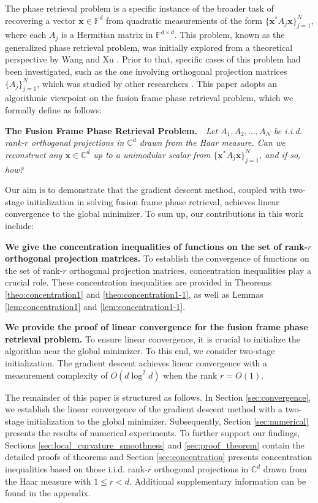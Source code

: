 \documentclass{article}
\newcommand{\C}{{\mathbb C}}
\newcommand{\bbF}{{\mathbb F}}
\newcommand{\vx}{{\mathbf x}}
\newcommand{\0}{{\mathbf 0}}
\numberwithin{equation}{section}
\begin{document}
	The phase retrieval problem is a specific instance of the broader task of recovering a vector $\mathbf{x} \in \bbF^d$ from quadratic measurements of the form $\{\mathbf{x}^* A_j \mathbf{x}\}_{j=1}^N$, where each $A_j$ is a Hermitian matrix in $\bbF^{d \times d}$.  This problem, known as the generalized phase retrieval problem, was initially explored from a theoretical perspective by Wang and Xu \citeyearpar{wang2019generalized}. Prior to that, specific cases of this problem had been investigated, such as the one involving orthogonal projection matrices $\{A_j\}_{j=1}^N$, which was studied by other researchers \citep{edidin2017projections, heinosaari2013quantum, cahill2016phase}. This paper adopts an algorithmic viewpoint on the fusion frame phase retrieval problem, which we formally define as follows:
	
	\medskip
	\noindent
	{\bf The Fusion Frame Phase Retrieval Problem.}~~{\em Let $A_1,A_2,\ldots,A_N$ be i.i.d. rank-$r$ orthogonal projections in $\C^d$ drawn from the Haar measure. Can we reconstruct any $\vx\in\C^d$ up to a unimodular scalar from $\{\vx^*A_j\vx\}_{j=1}^N$, and if so, how?}
	
	\medskip
	
	Our aim is to demonstrate that the gradient descent method, coupled with two-stage initialization in solving fusion frame phase retrieval, achieves linear convergence to the global minimizer. To sum up, our contributions in this work include:
	
	\noindent
	\textbf{We give the concentration inequalities of functions on the set of rank-$r$ orthogonal projection matrices.} To establish the convergence of functions on the set of rank-$r$ orthogonal projection matrices, concentration inequalities play a crucial role. These concentration inequalities are provided in Theorems \ref{theo:concentration1} and \ref{theo:concentration1-1}, as well as Lemmas \ref{lem:concentration1} and \ref{lem:concentration1-1}.
	
	\noindent
	\textbf{We provide the proof of linear convergence for the fusion frame phase retrieval problem.} 
	To ensure linear convergence, it is crucial to initialize the algorithm near the global minimizer. To this end, we consider two-stage initialization. The gradient descent achieves linear convergence with a measurement complexity of $O(d\log^2 d)$ when the rank $r = O(1)$.
	
	The remainder of this paper is structured as follows. In Section \ref{sec:convergence}, we establish the linear convergence of the gradient descent method with a two-stage initialization to the global minimizer. Subsequently, Section \ref{sec:numerical} presents the results of numerical experiments. To further support our findings,  Sections \ref{sec:local_curvature_smoothness} and \ref{sec:proof_theorem} contain the detailed proofs of theorems and Section \ref{sec:concentration} presents concentration inequalities based on those i.i.d. rank-$r$ orthogonal projections in $\C^d$ drawn from the Haar measure with $1\le r<d$. Additional supplementary information can be found in the appendix. 
\end{document}
